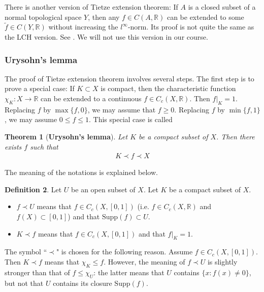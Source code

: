 \documentclass[12pt,b5paper,notitlepage]{article}
\theoremstyle{definition}
\newtheorem{df}{Definition}[section]
\theoremstyle{plain}
\newtheorem{thm}[df]{Theorem}
\newcommand{\wtd}{\widetilde}
\newcommand{\Rbb}{\mathbb R}
\newcommand{\Supp}{\mathrm{Supp}}
\numberwithin{equation}{section}
\begin{document}
There is another version of Tietze extension theorem: If $A$ is a closed subset of a normal topological space $Y$, then any $f\in C(A,\Rbb)$ can be extended to some $\wtd f\in C(Y,\Rbb)$ without increasing the  $l^\infty$-norm. Its proof is not quite the same as the LCH version. See \cite[Sec. 35]{Mun}. We will not use this version in our course. 




\subsubsection{Urysohn's lemma}



The proof of Tietze extension theorem involves several steps. The first step is to prove a special case: If $K\subset X$ is compact, then the characteristic function $\chi_K:X\rightarrow\Rbb$ can be extended to a continuous $f\in C_c(X,\Rbb)$. Then $f|_K=1$. Replacing $f$ by $\max\{f,0\}$, we may assume that $f\geq0$. Replacing $f$ by $\min\{f,1\}$, we may assume $0\leq f\leq 1$. This special case is called


\begin{thm}[\textbf{Urysohn's lemma}]
Let $K$ be a compact subset of $X$. Then there exists $f$ such that   
\begin{align}
K\prec f\prec X
\end{align}
\end{thm}

The meaning of the notations is explained below.

\begin{df}\label{lb465}
Let $U$ be an open subset of $X$. Let $K$ be a compact subset of $X$.
\begin{itemize}
\item $f\prec U$ means that $f\in C_c(X,[0,1])$  (i.e. $f\in C_c(X,\Rbb)$ and $f(X)\subset[0,1]$) and that $\Supp(f)\subset U$.
\item $K\prec f$ means that $f\in C_c(X,[0,1])$ and that $f|_K=1$.
\end{itemize} 
\end{df}
 

The symbol ``$\prec$" is chosen for the following reason. Assume $f\in C_c(X,[0,1])$. Then $K\prec f$ means that $\chi_K\leq f$. However, the meaning of $f\prec U$ is slightly stronger than that of $f\leq \chi_U$: the latter means that $U$ contains $\{x:f(x)\neq0\}$, but not that $U$ contains its closure $\Supp(f)$.
\end{document}
